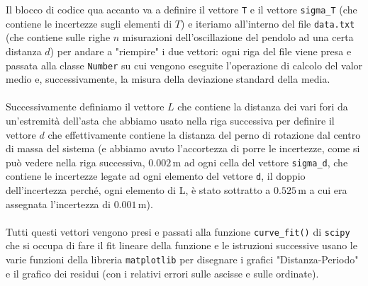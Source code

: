 \documentclass{article}
\begin{document}
\begin{minipage}{0.5\textwidth}
	\vspace{-1.5cm}
	Il blocco di codice qua accanto va a definire il vettore \texttt{T} e il vettore \texttt{sigma\_T} (che contiene le incertezze sugli elementi di $T$) e iteriamo all'interno del file \texttt{data.txt} (che contiene sulle righe $n$ misurazioni dell'oscillazione del pendolo ad una certa distanza $d$) per andare a "riempire" i due vettori: ogni riga del file viene presa e passata alla classe \texttt{Number} su cui vengono eseguite l'operazione di calcolo del valor medio e, successivamente, la misura della deviazione standard della media. \\ \\
	Successivamente definiamo il vettore $L$ che contiene la distanza dei vari fori da un'estremità dell'asta che abbiamo usato nella riga successiva per definire il vettore $d$ che effettivamente contiene la distanza del perno di rotazione dal centro di massa del sistema (e abbiamo avuto l'accortezza di porre le incertezze, come si può vedere nella riga successiva, $0.002 \, \text{m}$ ad ogni cella del vettore \texttt{sigma\_d}, che contiene le incertezze legate ad ogni elemento del vettore \texttt{d}, il doppio dell'incertezza perché, ogni elemento di L, è stato sottratto a $0.525 \, \text{m}$ a cui era assegnata l'incertezza di $0.001 \, \text{m}$). \\ \\ Tutti questi vettori vengono presi e passati alla funzione \texttt{curve\_fit()} di \texttt{scipy} che si occupa di fare il fit lineare della funzione e le istruzioni successive usano le varie funzioni della libreria \texttt{matplotlib} per disegnare i grafici "Distanza-Periodo" e il grafico dei residui (con i relativi errori sulle ascisse e sulle ordinate).
\end{minipage}
\hspace{0.06\textwidth}
\end{document}

